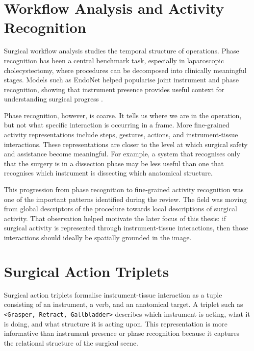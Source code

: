 \section{Workflow Analysis and Activity Recognition}
\label{sec:background-workflow}

Surgical workflow analysis studies the temporal structure of operations. Phase recognition has been a central benchmark task, especially in laparoscopic cholecystectomy, where procedures can be decomposed into clinically meaningful stages. Models such as EndoNet helped popularise joint instrument and phase recognition, showing that instrument presence provides useful context for understanding surgical progress \cite{endonet}.

Phase recognition, however, is coarse. It tells us where we are in the operation, but not what specific interaction is occurring in a frame. More fine-grained activity representations include steps, gestures, actions, and instrument-tissue interactions. These representations are closer to the level at which surgical safety and assistance become meaningful. For example, a system that recognises only that the surgery is in a dissection phase may be less useful than one that recognises which instrument is dissecting which anatomical structure.

This progression from phase recognition to fine-grained activity recognition was one of the important patterns identified during the review. The field was moving from global descriptors of the procedure towards local descriptions of surgical activity. That observation helped motivate the later focus of this thesis: if surgical activity is represented through instrument-tissue interactions, then those interactions should ideally be spatially grounded in the image.

\section{Surgical Action Triplets}
\label{sec:background-triplets}

Surgical action triplets formalise instrument-tissue interaction as a tuple consisting of an instrument, a verb, and an anatomical target. A triplet such as \texttt{<Grasper, Retract, Gallbladder>} describes which instrument is acting, what it is doing, and what structure it is acting upon. This representation is more informative than instrument presence or phase recognition because it captures the relational structure of the surgical scene.

